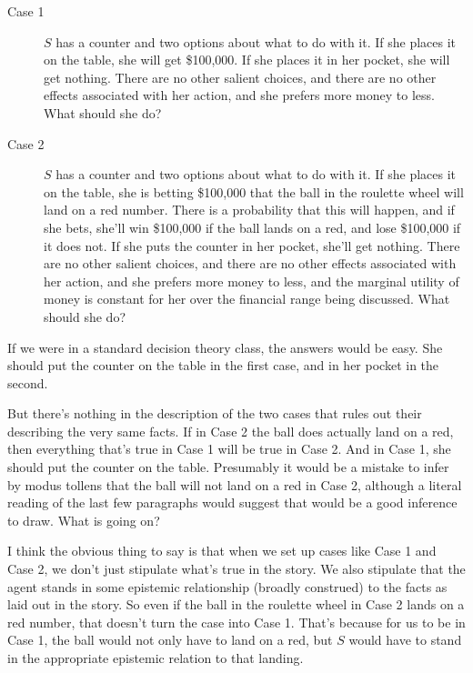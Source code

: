 {\begin{description}
\item[Case 1] \(S\) has a counter and two options about what to do with it. If she places it on the table, she will get \$100,000. If she places it in her pocket, she will get nothing. There are no other salient choices, and there are no other effects associated with her action, and she prefers more money to less. What should she do?
\item[Case 2] \(S\) has a counter and two options about what to do with it. If she places it on the table, she is betting \$100,000 that the ball in the roulette wheel will land on a red number. There is a  probability that this will happen, and if she bets, she'll win \$100,000 if the ball lands on a red, and lose \$100,000 if it does not. If she puts the counter in her pocket, she'll get nothing. There are no other salient choices, and there are no other effects associated with her action, and she prefers more money to less, and the marginal utility of money is constant for her over the financial range being discussed. What should she do?
\end{description}

\noindent If we were in a standard decision theory class, the answers would be easy. She should put the counter on the table in the first case, and in her pocket in the second. 

But there's nothing in the description of the two cases that rules out their describing the very same facts. If in Case 2 the ball does actually land on a red, then everything that's true in Case 1 will be true in Case 2. And in Case 1, she should put the counter on the table. Presumably it would be a mistake to infer by modus tollens that the ball will not land on a red in Case 2, although a literal reading of the last few paragraphs would suggest that would be a good inference to draw. What is going on?

I think the obvious thing to say is that when we set up cases like Case 1 and Case 2, we don't just stipulate what's true in the story. We also stipulate that the agent stands in some epistemic relationship (broadly construed) to the facts as laid out in the story. So even if the ball in the roulette wheel in Case 2 lands on a red number, that doesn't turn the case into Case 1. That's because for us to be in Case 1, the ball would not only have to land on a red, but \(S\) would have to stand in the appropriate epistemic relation to that landing.

}
